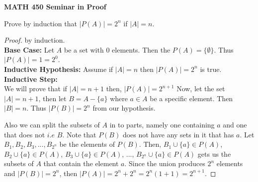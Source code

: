 \documentclass[14pt]{article}
\begin{document}
\begin{center}
		
{\bf MATH 450 Seminar in Proof}
 \\
\end{center}
	Prove by induction that $|P(A)| = 2^n$ if $|A| = n$.\\
\begin{proof}
	 by induction. \\
	
	\textbf{Base Case:} Let $A$ be a set with 0 elements. Then the $P(A) = \{ \emptyset \}$. Thus $|P(A)| = 1 = 2^0$.\\
	\textbf{Inductive Hypothesis:} Assume if $|A| = n$ then $|P(A)| = 2^n$ is true.
	\textbf{Inductive Step:}
	\\ We will prove that if $|A| = n+1$ then, $|P(A)| = 2^{n+1}$ Now, let the set $|A| = n+1$, then let $B = A - \{a\}$ where $a \in A$ be a specific element. Then $|B| = n$. Thus $|P(B)| = 2^n$ from our hypothesis.
	
	 Also we can split the subsets of $A$ in to parts, namely one containing $a$ and one that does not $i.e$ $B$. Note that $P(B)$ does not have any sets in it that has $a$. Let $B_1, B_2, B_3,...,B_{2^n}$ be the elements of $P(B)$. Then, $B_1 \cup \{a\} \in P(A)$, $B_2 \cup \{a\} \in P(A)$, $B_3 \cup \{a\} \in P(A)$, ..., $B_{2^n} \cup \{a\} \in P(A)$ gets us the subsets of $A$ that contain the element $a$. Since the union produces $2^n$ elements and $|P(B)| =2^n$, then $|P(A)| = 2^n + 2^n = 2^n(1+1) = 2^{n+1}$. 
\end{proof}
\end{document}
